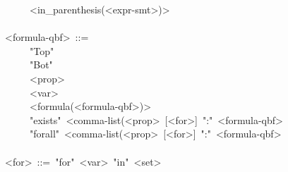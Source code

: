 \begin{footnotesize}
\begin{mdpre}
~~~~\textbar{}~\textless{}in\_parenthesis({\textless{}expr-smt\textgreater{})\textgreater{}}\\
\\
{\textless{}formula-qbf\textgreater{}}~::=\\
~~~~\textbar{}~"Top"\\
~~~~\textbar{}~"Bot"\\
~~~~\textbar{}~{\textless{}prop\textgreater{}}\\
~~~~\textbar{}~{\textless{}var\textgreater{}}\\
~~~~\textbar{}~{\textless{}formula(\textless{}formula-qbf\textgreater{})\textgreater{}}\\
~~~~\textbar{}~"exists"~{\textless{}comma-list(\textless{}prop\textgreater{}}~{}[{\textless{}for\textgreater{}}]~":"~{\textless{}formula-qbf\textgreater{}}\\
~~~~\textbar{}~"forall"~{\textless{}comma-list(\textless{}prop\textgreater{}}~{}[{\textless{}for\textgreater{}}]~":"~{\textless{}formula-qbf\textgreater{}}\\
\\
{\textless{}for\textgreater{}}~::=~"for"~{\textless{}var\textgreater{}}~"in"~{\textless{}set\textgreater{}}%
\end{mdpre}

\end{footnotesize}